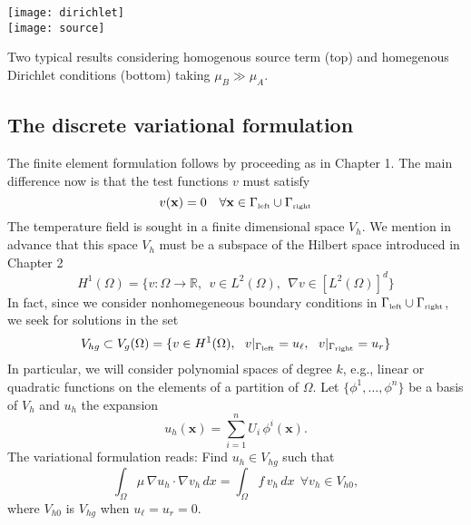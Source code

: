 \begin{marginfigure}[-2.0cm]
\begin{center}
\texttt{[image: dirichlet]}\\
\texttt{[image: source]}
\end{center}
\caption[]{Two typical results considering homogenous source term (top) and homegenous Dirichlet
conditions (bottom) taking $\mu_B \gg \mu_A$.} 
\end{marginfigure}

\subsection*{The discrete variational formulation}

The finite element formulation follows by proceeding as in Chapter 1.
The main difference now is that the test functions $v$ must satisfy
\begin{equation}
v(\mathbf{x}) = 0~~~\forall \mathbf{x} \in \Gamma_{\mbox{\tiny left}} \cup \Gamma_{\mbox{\tiny right}}
\end{equation}
The temperature field is sought in a finite dimensional space $V_h$. We mention in advance that this space $V_h$ must be a
subspace of the Hilbert space introduced in Chapter 2
\begin{equation}
H^1(\Omega)
= \{v : \Omega \rightarrow \mathbb{R},~~v \in L^2(\Omega),~~\nabla{v} \in [L^2(\Omega)]^d \}\nonumber
\end{equation}
In fact, since we consider nonhomegeneous boundary conditions in
$\Gamma_{\mbox{\tiny left}} \cup \Gamma_{\mbox{\tiny right}}$, we seek for solutions
in the set
\begin{equation}
V_{hg} \subset V_g(\Omega) = \{v \in H^1(\Omega),~~v|_{\Gamma_{\mbox{\tiny left}}} = u_{\ell},~~v|_{\Gamma_{\mbox{\tiny right}}} = u_{r} \}\nonumber
\end{equation}
In particular, we will consider polynomial spaces of degree $k$, e.g., linear or quadratic functions
on the elements of a partition of $\Omega$. 
Let $\{\phi^1,\dots,\phi^n \}$ be a basis of
$V_h$ and $u_h$ the expansion
\begin{equation}
u_h(\mathbf{x}) = \sum_{i=1}^n {U_i \,\phi^i(\mathbf{x})}. \nonumber
\end{equation}
The variational formulation reads: Find ${u}_h \in V_{hg}$ such that
\begin{equation}
\int_{\Omega} {\mu \, \nabla{u}_h \cdot \nabla{v }_h} \, d{x} = \int_{\Omega} { {f} \, {v}_h} \, dx~~\forall {v}_h\in V_{h0},
\end{equation}
where $V_{h0}$ is $V_{hg}$ when $u_{\ell} = u_r = 0$.

